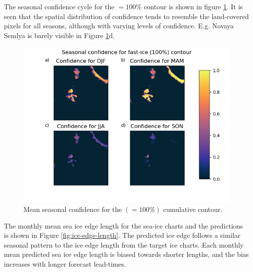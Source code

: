 \documentclass[../main/thesis.tex]{subfiles}
\begin{document}
The seasonal confidence cycle for the $=100\%$ contour is shown in figure \ref{fig:confidence_seasonal}. It is seen that the spatial distribution of confidence tends to resemble the land-covered pixels for all seasons, although with varying levels of confidence. E.g. Novaya Semlya is barely visible in Figure \ref{fig:confidence_seasonal}d.

\begin{figure}
    \centering
    \includegraphics[width=\textwidth]{confidence_test_contour_6}
    \caption{\label{fig:confidence_seasonal}Mean seasonal confidence for the $(=100\%)$ cumulative contour.}
\end{figure}

The monthly mean sea ice edge length for the sea-ice charts and the predictions is shown in Figure \ref{fig:ice-edge-length}. The predicted ice edge follows a similar seasonal pattern to the ice edge length from the target ice charts. Each monthly mean predicted sea ice edge length is biased towards shorter lengths, and the bias increases with longer forecast lead-times.
\end{document}
